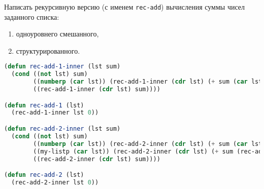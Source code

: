 Написать рекурсивную версию (с именем \verb|rec-add|) вычисления суммы чисел заданного
списка:
\begin{enumerate}
    \item одноуровнего смешанного,
    \item структурированного.
\end{enumerate}

\begin{lstlisting}[language=Lisp]
(defun rec-add-1-inner (lst sum)
  (cond ((not lst) sum)
        ((numberp (car lst)) (rec-add-1-inner (cdr lst) (+ sum (car lst))))
        ((rec-add-1-inner (cdr lst) sum))))

(defun rec-add-1 (lst)
  (rec-add-1-inner lst 0))

(defun rec-add-2-inner (lst sum)
  (cond ((not lst) sum)
        ((numberp (car lst)) (rec-add-2-inner (cdr lst) (+ sum (car lst))))
        ((my-listp (car lst)) (rec-add-2-inner (cdr lst) (+ sum (rec-add-2-inner (car lst) 0))))
        ((rec-add-2-inner (cdr lst) sum))))

(defun rec-add-2 (lst)
  (rec-add-2-inner lst 0))
\end{lstlisting}

